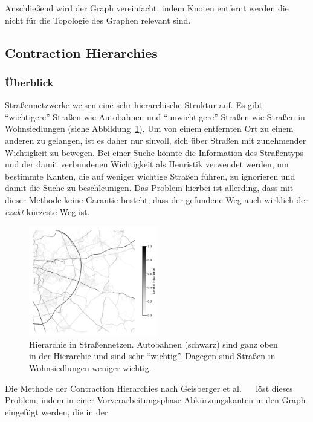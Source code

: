 Anschließend wird der Graph vereinfacht,
indem Knoten entfernt werden die nicht für die Topologie des Graphen relevant sind.\\




\subsection{Contraction Hierarchies}
\subsubsection{Überblick}
Straßennetzwerke weisen eine sehr hierarchische Struktur auf. Es gibt "`wichtigere"' Straßen wie \zB
Autobahnen und "`unwichtigere"' Straßen wie \zB Straßen in Wohnsiedlungen (siehe
Abbildung~\ref{fig:road_hierarchy}). Um von einem entfernten Ort zu einem anderen zu gelangen, ist
es daher nur sinvoll, sich über Straßen mit zunehmender Wichtigkeit zu bewegen. Bei einer Suche
könnte die Information des Straßentyps und der damit verbundenen Wichtigkeit als Heuristik verwendet
werden, um bestimmte Kanten, die auf weniger wichtige Straßen führen,  zu ignorieren und damit die
Suche zu beschleunigen. Das Problem hierbei ist allerding, dass mit dieser Methode keine Garantie
besteht, dass der gefundene Weg auch wirklich der \emph{exakt} kürzeste Weg ist.
\begin{figure}[h]
    \centering
    \includegraphics[width=0.5\textwidth]{figures/road_hierarchy.png}
    \caption[Hierarchie in Straßennetzen]{Hierarchie in Straßennetzen. Autobahnen (schwarz) sind
        ganz oben in der Hierarchie und sind sehr "`wichtig"'. Dagegen sind Straßen in
        Wohnsiedlungen weniger wichtig. \osmcr}
    \label{fig:road_hierarchy}
\end{figure}
Die Methode der Contraction Hierarchies nach Geisberger et al.
\cite{geisberger.workshop}~\cite{geisberger.thesis}~\cite{geisberger.exact} löst dieses Problem,
indem in einer Vorverarbeitungsphase Abkürzungskanten in den Graph eingefügt werden, die in der
